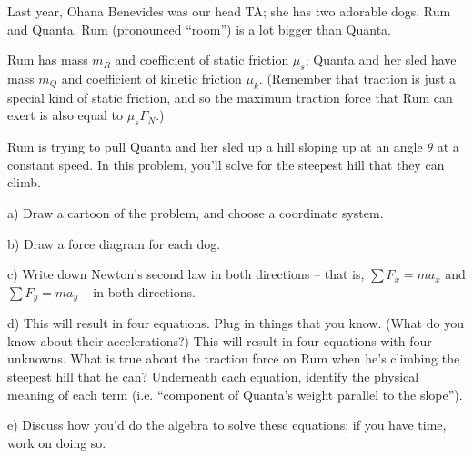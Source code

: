 \documentclass[12pt]{article}
\begin{document}
\newpage

Last year, Ohana Benevides was our head TA; she has two adorable dogs, Rum and Quanta. Rum (pronounced ``room'') is a lot bigger than Quanta. 

Rum has mass $m_R$ and coefficient of static friction $\mu_s$; Quanta and her sled have mass $m_Q$ and coefficient of kinetic friction $\mu_k$. (Remember that traction is just a special kind of static friction, and so the maximum traction force that Rum can exert is also equal to $\mu_s F_N$.)

Rum is trying to pull Quanta and her sled up a hill sloping up at an angle $\theta$ at a constant speed. In this problem, you'll solve for the
steepest hill that they can climb.

a) Draw a cartoon of the problem, and choose a coordinate system. 

\vspace{2in}

b) Draw a force diagram for each dog. 

\vspace{3in}
\newpage
c) Write down Newton's second law in both directions -- that is, $\sum F_x = ma_x$ and $\sum F_y = ma_y$ -- 
in both directions.

\vspace{2in}
d) This will result in four equations. Plug in things that you know. (What do you know about their accelerations?) This will result in four equations with 
four unknowns. What is true about the traction force on Rum when he's climbing the steepest hill that he can?
Underneath each equation, identify the physical meaning of each term (i.e. ``component of Quanta's weight parallel to the slope''). 

\vspace{3.5in}

e) Discuss how you'd do the algebra to solve these equations; if you have time, work on doing so.
\end{document}
